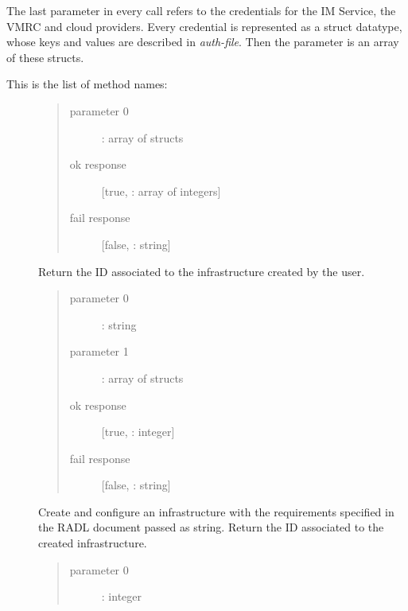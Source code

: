 \documentclass[letterpaper,10pt,english]{sphinxmanual}
\begin{document}
The last parameter in every call refers
to the credentials for the IM Service, the VMRC and cloud providers.
Every credential is represented as a struct datatype, whose keys and values are
described in \emph{auth-file}. Then the parameter is an array of these
structs.

This is the list of method names:
\begin{description}
\item[{}] \leavevmode\begin{quote}\begin{description}
\item[{parameter 0}] \leavevmode
{}: array of structs

\item[{ok response}] \leavevmode
{[}true, : array of integers{]}

\item[{fail response}] \leavevmode
{[}false, : string{]}

\end{description}\end{quote}

Return the ID associated to the infrastructure created by the user.

\item[{}] \leavevmode\begin{quote}\begin{description}
\item[{parameter 0}] \leavevmode
{}: string

\item[{parameter 1}] \leavevmode
{}: array of structs

\item[{ok response}] \leavevmode
{[}true, : integer{]}

\item[{fail response}] \leavevmode
{[}false, : string{]}

\end{description}\end{quote}

Create and configure an infrastructure with the requirements specified in
the RADL document passed as string. Return the ID associated to the created
infrastructure.

\item[{}] \leavevmode\begin{quote}\begin{description}
\item[{parameter 0}] \leavevmode
{}: integer


\end{description}
\end{quote}
\end{description}
\end{document}
